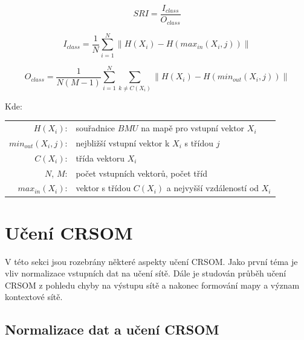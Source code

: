\documentclass[thesis=M,czech]{FITthesis}[2012/06/26]
\begin{document}
\vspace{\baselineskip}
\noindent
\begin{minipage}[c]{\textwidth }

\begin{equation} \label{eq:sri}
    SRI=\frac{I_{class}}{O_{class}}
\end{equation}

\begin{equation} \label{eq:oclass}
	I_{class}  = \frac{1}{N}\sum_{i=1}^{N}  \| H(X_i) - H(max_{in}(X_i, j)) \|
\end{equation}


\begin{equation} \label{eq:iclass}
	O_{class}= \frac{1}{N(M-1)}\sum_{i=1}^{N}\sum_{k \neq C(X_i)} \| H(X_i) - H(min_{out}(X_i, j)) \|
\end{equation}



Kde:\\
\hspace*{3em}
\begin{tabular}{rl}
    $H(X_i)$:&  souřadnice $BMU$ na mapě pro vstupní vektor $X_i$  \\
    $min_{out}(X_i, j)$: & nejbližší vstupní vektor k $X_i$ s třídou $j$  \\
     $C(X_i)$:& třída vektoru  $X_i$\\
     $N$, $M$:& počet vstupních vektorů, počet tříd\\
     $max_{in}(X_i)$:& vektor s třídou $C(X_i)$ a nejvyšší vzdáleností od $X_i$ \\
\end{tabular}
\end{minipage} 
\vspace{\baselineskip}
\noindent


  
\section{Učení CRSOM}
V této sekci jsou rozebrány některé aspekty učení CRSOM. Jako první téma je vliv normalizace vstupních dat na učení sítě. Dále je studován průběh učení CRSOM z pohledu chyby na výstupu sítě a nakonec formování mapy a význam kontextové sítě.



\subsection{Normalizace dat a učení CRSOM}
\end{document}
